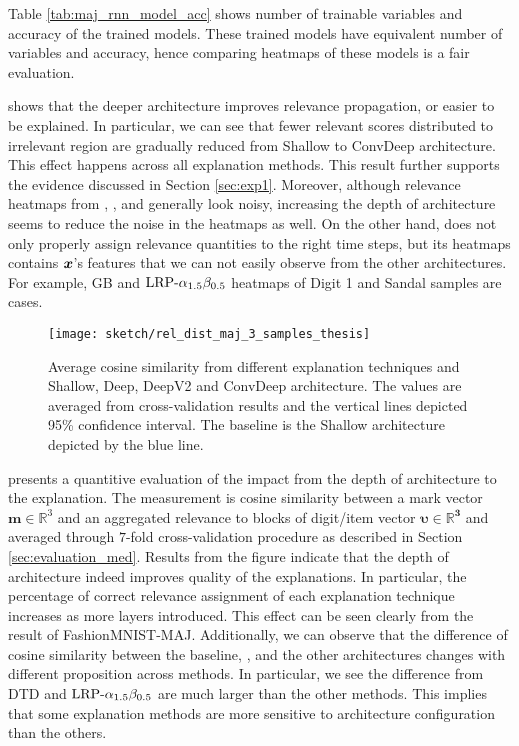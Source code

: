 Table \ref{tab:maj_rnn_model_acc} shows number of trainable variables and accuracy of the trained models. These trained models have equivalent number of variables and accuracy, hence comparing heatmaps of these models is a fair evaluation.

\addfigure{\ref{fig:heatmap_msc_mix_for_thesis}} shows that the deeper architecture improves relevance propagation, or easier to be explained. In particular, we can see that fewer relevant scores distributed to irrelevant region are gradually reduced from Shallow to ConvDeep architecture. This effect happens across all explanation methods. This result further supports the evidence discussed in Section \ref{sec:exp1}.  Moreover, although relevance heatmaps from , , and  generally look noisy, increasing the depth of architecture seems to reduce the noise in the heatmaps as well.   On the other hand,  does not  only properly assign relevance quantities to the right time steps, but its heatmaps contains $\boldsymbol{x}$'s features that we can not easily observe from the other architectures. For example, GB and $\text{LRP-}\alpha_{1.5}\beta_{0.5}$ heatmaps of Digit 1 and Sandal samples are cases.

\clearpage

 \begin{figure}[!hbt]
\centering
\texttt{[image: sketch/rel\_dist\_maj\_3\_samples\_thesis]}
\caption{Average cosine similarity from different explanation techniques and Shallow, Deep, DeepV2 and ConvDeep architecture. The values are averaged from cross-validation results and the vertical lines depicted 95\% confidence interval. The baseline is the Shallow architecture depicted by the blue line.} 
\label{fig:rel_dist_maj_3_samples_thesis}
\end{figure}

\addfigure{\ref{fig:rel_dist_maj_3_samples_thesis}} presents a quantitive  evaluation of the impact from the depth of architecture to the explanation. The measurement is cosine similarity between a mark vector $\boldsymbol{m} \in \mathbb{R}^3$ and an aggregated relevance to blocks of digit/item vector $\boldsymbol{\upsilon \in \mathbb{R}^3 }$ and averaged through $7$-fold cross-validation procedure as described in Section \ref{sec:evaluation_med}. Results from the figure indicate that the depth of architecture indeed improves quality of the explanations. In particular, the percentage of correct relevance assignment of each explanation technique increases as more layers introduced. This effect can be seen clearly from the result of FashionMNIST-MAJ. Additionally, we can observe that the difference of cosine similarity between the baseline, , and the other  architectures changes with different proposition across methods. In particular, we see the difference from DTD and $\text{LRP-}\alpha_{1.5}\beta_{0.5}$ are much larger than the other methods. This implies that some explanation methods are more sensitive to architecture configuration than the others.


